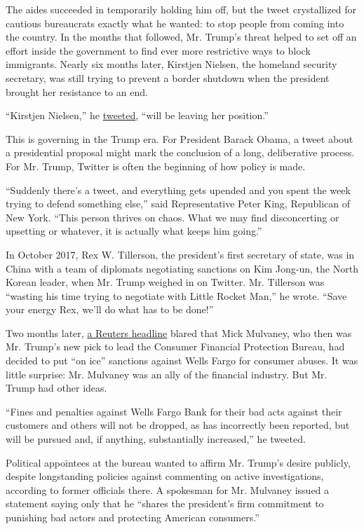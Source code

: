 The aides succeeded in temporarily holding him off, but the tweet
crystallized for cautious bureaucrats exactly what he wanted: to stop
people from coming into the country. In the months that followed, Mr.
Trump's threat helped to set off an effort inside the government to find
ever more restrictive ways to block immigrants. Nearly six months later,
Kirstjen Nielsen, the homeland security secretary, was still trying to
prevent a border shutdown when the president brought her resistance to
an end.

``Kirstjen Nielsen,'' he
\href{https://twitter.com/realDonaldTrump/status/1115011884154064896?ref_src=twsrc\%5Etfw}{tweeted},
``will be leaving her position.''

This is governing in the Trump era. For President Barack Obama, a tweet
about a presidential proposal might mark the conclusion of a long,
deliberative process. For Mr. Trump, Twitter is often the beginning of
how policy is made.

``Suddenly there's a tweet, and everything gets upended and you spent
the week trying to defend something else,'' said Representative Peter
King, Republican of New York. ``This person thrives on chaos. What we
may find disconcerting or upsetting or whatever, it is actually what
keeps him going.''

In October 2017, Rex W. Tillerson, the president's first secretary of
state, was in China with a team of diplomats negotiating sanctions on
Kim Jong-un, the North Korean leader, when Mr. Trump weighed in on
Twitter. Mr. Tillerson was ``wasting his time trying to negotiate with
Little Rocket Man,'' he wrote. ``Save your energy Rex, we'll do what has
to be done!''

Two months later,
\href{https://www.reuters.com/article/us-usa-trump-wells-fargo-exclusive/exclusive-wells-fargo-sanctions-are-on-ice-under-trump-official-sources-idUSKBN1E12Y5}{a
Reuters headline} blared that Mick Mulvaney, who then was Mr. Trump's
new pick to lead the Consumer Financial Protection Bureau, had decided
to put ``on ice'' sanctions against Wells Fargo for consumer abuses. It
was little surprise: Mr. Mulvaney was an ally of the financial industry.
But Mr. Trump had other ideas.

``Fines and penalties against Wells Fargo Bank for their bad acts
against their customers and others will not be dropped, as has
incorrectly been reported, but will be pursued and, if anything,
substantially increased,'' he tweeted.

Political appointees at the bureau wanted to affirm Mr. Trump's desire
publicly, despite longstanding policies against commenting on active
investigations, according to former officials there. A spokesman for Mr.
Mulvaney issued a statement saying only that he ``shares the president's
firm commitment to punishing bad actors and protecting American
consumers.''

